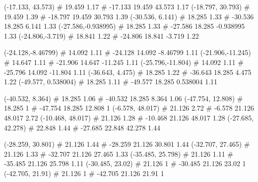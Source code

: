 \documentclass[a4paper,openbib,10pt]{article}
\newenvironment{treegraph}{\begin{graph}}{\end{graph}}
\begin{document}
\begin{treegraph}
  (-17.133, 43.573) #     19.459    1.17
   #    -17.133    19.459    43.573    1.17
  (-18.797, 30.793) #     19.459    1.39
   #    -18.797    19.459    30.793    1.39
  (-30.536, 6.141) #     18.285    1.33
   #    -30.536    18.285    6.141    1.33
  (-27.586,-0.938995) #     18.285    1.33
   #    -27.586    18.285    -0.938995    1.33
  (-24.806,-3.719) #     18.841    1.22
   #    -24.806    18.841    -3.719    1.22

  (-24.128,-8.46799) #     14.092    1.11
   #    -24.128    14.092    -8.46799    1.11
  (-21.906,-11.245) #     14.647    1.11
   #    -21.906    14.647    -11.245    1.11
  (-25.796,-11.804) #     14.092    1.11
   #    -25.796    14.092    -11.804    1.11
  (-36.643, 4.475) #     18.285    1.22
   #    -36.643    18.285    4.475    1.22
  (-49.577, 0.538004) #     18.285    1.11
   #    -49.577    18.285    0.538004    1.11

  (-40.532, 8.364) #     18.285    1.06
   #    -40.532    18.285    8.364    1.06
  (-47.754, 12.808) #     18.285    1
   #    -47.754    18.285    12.808    1
  (-6.578, 48.017) #     21.126    2.72
   #    -6.578    21.126    48.017    2.72
  (-10.468, 48.017) #     21.126    1.28
   #    -10.468    21.126    48.017    1.28
  (-27.685, 42.278) #     22.848    1.44
   #    -27.685    22.848    42.278    1.44

  (-28.259, 30.801) #     21.126    1.44
   #    -28.259    21.126    30.801    1.44
  (-32.707, 27.465) #     21.126    1.33
   #    -32.707    21.126    27.465    1.33
  (-35.485, 25.798) #     21.126    1.11
   #    -35.485    21.126    25.798    1.11
  (-30.485, 23.02) #     21.126    1
   #    -30.485    21.126    23.02    1
  (-42.705, 21.91) #     21.126    1
   #    -42.705    21.126    21.91    1


\end{treegraph}
\end{document}
